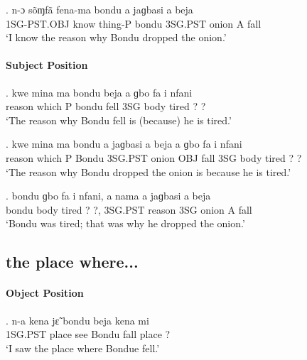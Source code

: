 \documentclass{assets/fieldnotes}
\begin{document}
{

\exg.
n-ɔ      sõɱfã   fena-ma   bondu   a     jaɡbasi   a   beja \\
1SG-PST.OBJ   know     thing-P      bondu   3SG.PST   onion     A   fall \\%
`I know the reason why Bondu dropped the onion.'

\paragraph*{Subject Position}

\exg.
kwe   mina ma   bondu   beja   a     ɡbo    fa      i   nfani \\
reason  which P   bondu   fell   3SG   body   tired   ?   ?     \\
`The reason why Bondu fell is (because) he is tired.'

\exg.
kwe   mina ma   bondu   a     jaɡbasi   a     beja   a     ɡbo    fa      i   nfani \\
reason     which P   Bondu   3SG.PST   onion     OBJ   fall   3SG   body   tired   ?   ?     \\
`The reason why Bondu dropped the onion is because he is tired.'

\exg.
bondu   ɡbo    fa      i   nfani,   a     nama     a     jaɡbasi   a   beja \\
bondu   body   tired   ?   ?,       3SG.PST   reason   3SG   onion     A   fall \\%
`Bondu was tired; that was why he dropped the onion.'

\subsection*{the place where...}

\paragraph*{Object Position}

\exg.
n-a    kena    jɛ̃    bondu   beja   kena    mi \\
1SG.PST   place   see   Bondu   fall   place   ?  \\%
`I saw the place where Bondue fell.'

}
\end{document}
